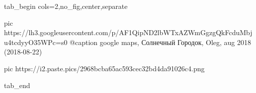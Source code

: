  
 
 
 
 


\ifcmt
  tab_begin cols=2,no_fig,center,separate

     pic https://lh3.googleusercontent.com/p/AF1QipND2lbWTxAZWmGgzgQkFcduMbju4tcdyyO35WPc=s0
		 @caption google maps, Солнечный Городок, Oleg, aug 2018 (2018-08-22)

		 pic https://i2.paste.pics/2968bcba65ac593cec32bd4da91026c4.png

  tab_end
\fi
